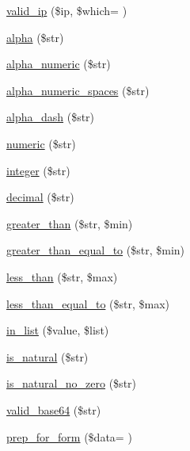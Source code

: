 \begin{DoxyCompactItemize}
\item 
\hyperlink{class_c_i___form__validation_a2adf8f23c98fcdafdc7588f874db4c4d}{valid\+\_\+ip} (\$ip, \$which= \textquotesingle{}\textquotesingle{})
\item 
\hyperlink{class_c_i___form__validation_a4784b18b432005bec36cdf437353ec76}{alpha} (\$str)
\item 
\hyperlink{class_c_i___form__validation_aa3b561d437be2774b1a6850ada97024a}{alpha\+\_\+numeric} (\$str)
\item 
\hyperlink{class_c_i___form__validation_a9c7e61a17f9ff3cbf176d7afab3b1555}{alpha\+\_\+numeric\+\_\+spaces} (\$str)
\item 
\hyperlink{class_c_i___form__validation_a4d1ca92bb78369923e57b2f6aca58c70}{alpha\+\_\+dash} (\$str)
\item 
\hyperlink{class_c_i___form__validation_a058a2b065a28a929956630238d5bf5bb}{numeric} (\$str)
\item 
\hyperlink{class_c_i___form__validation_af1c6586c2e80ccbb28b09803c3b5461c}{integer} (\$str)
\item 
\hyperlink{class_c_i___form__validation_af460b7c2f8d785b7472329446c600f31}{decimal} (\$str)
\item 
\hyperlink{class_c_i___form__validation_a8dd73c5e1d6880a650bb41e1ec6ee2f4}{greater\+\_\+than} (\$str, \$min)
\item 
\hyperlink{class_c_i___form__validation_a003319a504eca3e9d1b608f8e48f2daf}{greater\+\_\+than\+\_\+equal\+\_\+to} (\$str, \$min)
\item 
\hyperlink{class_c_i___form__validation_a4f5222d1cc44e64ce520d94358f25291}{less\+\_\+than} (\$str, \$max)
\item 
\hyperlink{class_c_i___form__validation_aa7a42f791a145f6c36ad2b8babcb9c21}{less\+\_\+than\+\_\+equal\+\_\+to} (\$str, \$max)
\item 
\hyperlink{class_c_i___form__validation_a27365f05674ed5c959747000113f29aa}{in\+\_\+list} (\$value, \$list)
\item 
\hyperlink{class_c_i___form__validation_aaf9d0b9bdaaef3658a78dd6a01629e5d}{is\+\_\+natural} (\$str)
\item 
\hyperlink{class_c_i___form__validation_ae4f399db6305e565bcf9acd70eea86a6}{is\+\_\+natural\+\_\+no\+\_\+zero} (\$str)
\item 
\hyperlink{class_c_i___form__validation_a9bec2f0a508e0327d4b048ecfc204522}{valid\+\_\+base64} (\$str)
\item 
\hyperlink{class_c_i___form__validation_a964633906e543eeb7851e78f1ed26da8}{prep\+\_\+for\+\_\+form} (\$data= \textquotesingle{}\textquotesingle{})

\end{DoxyCompactItemize}
